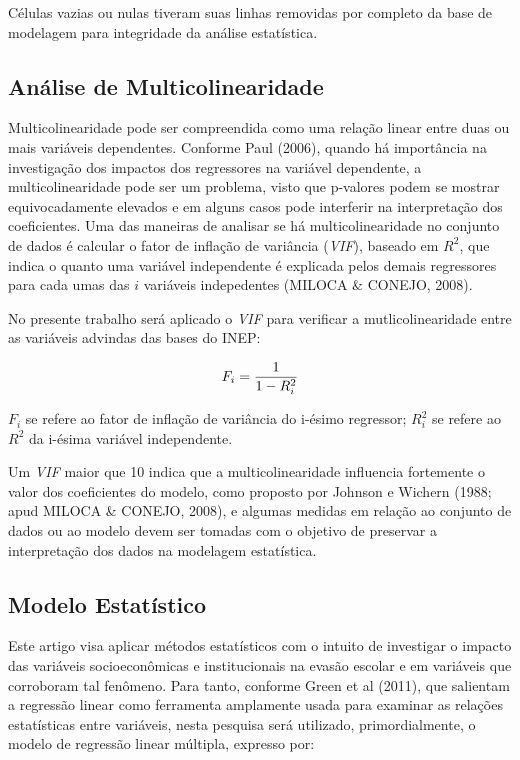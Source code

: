 \documentclass[english, spanish, brazilian]{RBIEarticle} %
\begin{document}
Células vazias ou nulas tiveram suas linhas removidas por completo da base de modelagem para integridade da análise estatística.

\subsection{Análise de Multicolinearidade}
Multicolinearidade pode ser compreendida como uma relação linear entre duas ou mais variáveis dependentes. Conforme Paul (2006), quando há importância na investigação dos impactos dos regressores na variável dependente, a multicolinearidade pode ser um problema, visto que p-valores podem se mostrar equivocadamente elevados e em alguns casos pode interferir na interpretação dos coeficientes. Uma das maneiras de analisar se há multicolinearidade no conjunto de dados é calcular o fator de inflação de variância (\textit{VIF}), baseado em $R^2$, que indica o quanto uma variável independente é explicada pelos demais regressores para cada umas das $i$ variáveis indepedentes (MILOCA \& CONEJO, 2008).

No presente trabalho será aplicado o \textit{VIF} para verificar a mutlicolinearidade entre as variáveis advindas das bases do INEP:

\vspace{0.5cm}
\begin{equation}
\large F_i = \frac{1}{1-R_i^2}
\end{equation}
\vspace{0.5cm}


$F_i$ se refere ao fator de inflação de variância do i-ésimo regressor; $R_i^2$ se refere ao $R^2$ da i-ésima variável independente.

Um \textit{VIF} maior que 10 indica que a multicolinearidade influencia fortemente o valor dos coeficientes do modelo, como proposto por Johnson e Wichern (1988; apud MILOCA \& CONEJO, 2008), e algumas medidas em relação ao conjunto de dados ou ao modelo devem ser tomadas com o objetivo de preservar a interpretação dos dados na modelagem estatística.

\subsection{Modelo Estatístico}
Este artigo visa aplicar métodos estatísticos com o intuito de investigar o impacto das variáveis socioeconômicas e institucionais na evasão escolar e em variáveis que corroboram tal fenômeno. Para tanto, conforme Green et al (2011), que salientam a regressão linear como ferramenta amplamente usada para examinar as relações estatísticas entre variáveis, nesta pesquisa será utilizado, primordialmente, o modelo de regressão linear múltipla, expresso por:
\end{document}
